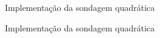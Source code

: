 

\begin{frame}[fragile]{Implementação da sondagem quadrática}
\end{frame}

\begin{frame}[fragile]{Implementação da sondagem quadrática}
\end{frame}


